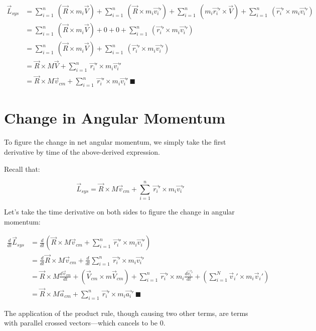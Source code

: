 \documentclass[letterpaper]{article}
\begin{document}
\begin{align}
 \vec{L}_{sys} &= \sum_{i=1}^n\ (\vec{R} \times m_i\vec{V}) +\sum_{i=1}^n\  (\vec{R} \times m_i\vec{v_i}') +\sum_{i=1}^n\  (m_i\vec{r_i}' \times \vec{V}) +\sum_{i=1}^n\  (\vec{r_i}' \times m_i\vec{v_i}')\\
&= \sum_{i=1}^n\ (\vec{R} \times m_i\vec{V}) +0 +0 +\sum_{i=1}^n\  (\vec{r_i}' \times m_i\vec{v_i}')\\
&= \sum_{i=1}^n\ (\vec{R} \times m_i\vec{V}) +\sum_{i=1}^n\  (\vec{r_i}' \times m_i\vec{v_i}')\\
&= \vec{R} \times M\vec{V} + \sum_{i=1}^n\  \vec{r_i}' \times m_i\vec{v_i}'\\ 
&= \vec{R} \times M\vec{v}_{cm} + \sum_{i=1}^n\  \vec{r_i}' \times m_i\vec{v_i}'\ \blacksquare
\end{align}

\section{Change in Angular Momentum}
\label{sec:org55606c7}
To figure the change in net angular momentum, we simply take the first derivative by time of the above-derived expression.

Recall that:

\begin{equation}
  \vec{L}_{sys} =\vec{R} \times M\vec{v}_{cm} + \sum_{i=1}^n\  \vec{r_i}' \times m_i\vec{v_i}'
\end{equation}

Let's take the time derivative on both sides to figure the change in angular momentum:

\begin{align}
   \frac{d}{dt} \vec{L}_{sys} &=\frac{d}{dt} \left(\vec{R} \times M\vec{v}_{cm} + \sum_{i=1}^n\  \vec{r_i}' \times m_i\vec{v_i}' \right) \\
&= \frac{d}{dt} \vec{R} \times M\vec{v}_{cm} + \frac{d}{dt} \sum_{i=1}^n\  \vec{r_i}' \times m_i\vec{v_i}'  \\
&= \vec{R} \times M\frac{d\vec{v}_{cm}}{dt}  + \left(\vec{V}_{cm} \times m \vec{V}_{cm}\right)+ \sum_{i=1}^n\  \vec{r_i}' \times m_i\frac{d\vec{v_i}'}{dt} + \left(\sum_{i=1}^N \vec{v}_i' \times m_i \vec{v}_i'\right)  \\
&= \vec{R} \times M\vec{a}_{cm}  + \sum_{i=1}^n\  \vec{r_i}' \times m_i \vec{a_i}'\ \blacksquare
\end{align}

The application of the product rule, though causing two other terms, are terms with parallel crossed vectors---which cancels to be \(0\).
\end{document}
